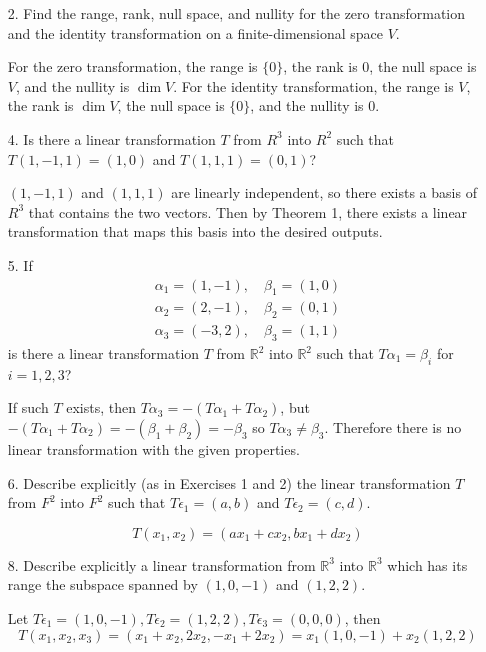 \documentclass{article}
\begin{document}
\begin{enumerate}[listparindent=\parindent]
\item[2.] Find the range, rank, null space, and nullity for the zero transformation and the identity transformation
    on a finite-dimensional space \(V\).

    For the zero transformation, the range is \(\{0\}\), the rank is 0, the null space is \(V\), and the nullity is \(\dim V\).
    For the identity transformation, the range is \(V\), the rank is \(\dim V\), the null space is \(\{0\}\), and the nullity is 0.

\item[4.] Is there a linear transformation \(T\) from \(R^3\) into \(R^2\) such that \(T(1, -1, 1) = (1, 0)\) and \(T(1, 1, 1) = (0, 1)\)?

    \((1, -1, 1)\) and \((1, 1, 1)\) are linearly independent, so there exists a basis of \(R^3\) that contains the two vectors.
    Then by Theorem 1, there exists a linear transformation that maps this basis into the desired outputs.

\item[5.] If
    \begin{gather*}
        \alpha_1 = (1, -1),\quad \beta_1 = (1, 0) \\
        \alpha_2 = (2, -1),\quad \beta_2 = (0, 1) \\
        \alpha_3 = (-3, 2),\quad \beta_3 = (1, 1)
    \end{gather*}
    is there a linear transformation \(T\) from \(\mathbb{R}^2\) into \(\mathbb{R}^2\) such that \(T\alpha_1 = \beta_i\) for \(i = 1, 2, 3\)?

    If such \(T\) exists, then \(T\alpha_3 = -(T\alpha_1 + T\alpha_2)\),
    but \(-(T\alpha_1 + T\alpha_2) = -(\beta_1 + \beta_2) = -\beta_3\) so \(T\alpha_3 \neq \beta_3\).
    Therefore there is no linear transformation with the given properties.

\item[6.] Describe explicitly (as in Exercises 1 and 2) the linear transformation \(T\) from \(F^2\) into \(F^2\)
    such that \(T\epsilon_1 = (a, b)\) and \(T\epsilon_2 = (c, d)\).

    \[T(x_1, x_2) = (ax_1 + cx_2, bx_1 + dx_2)\]

\item[8.] Describe explicitly a linear transformation from \(\mathbb{R}^3\) into \(\mathbb{R}^3\)
    which has its range the subspace spanned by \((1, 0, -1)\) and \((1, 2, 2)\).

    Let \(T\epsilon_1 = (1, 0, -1), T\epsilon_2 = (1, 2, 2), T\epsilon_3 = (0, 0, 0)\), then
    \[T(x_1, x_2, x_3) = (x_1 + x_2, 2x_2, -x_1 + 2x_2) = x_1(1, 0, -1) + x_2(1, 2, 2)\]


\end{enumerate}
\end{document}
